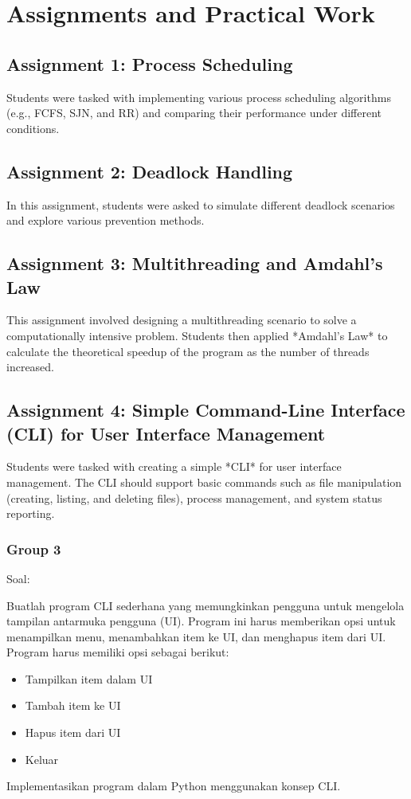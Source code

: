 \documentclass[12pt]{article}
\begin{document}
	\section{Assignments and Practical Work}
	\subsection{Assignment 1: Process Scheduling}
	Students were tasked with implementing various process scheduling algorithms (e.g., FCFS, SJN, and RR) and comparing their performance under different conditions.
	
	\subsection{Assignment 2: Deadlock Handling}
	In this assignment, students were asked to simulate different deadlock scenarios and explore various prevention methods.
	
	\subsection{Assignment 3: Multithreading and Amdahl's Law}
	This assignment involved designing a multithreading scenario to solve a computationally intensive problem. Students then applied *Amdahl's Law* to calculate the theoretical speedup of the program as the number of threads increased.
	
	\subsection{Assignment 4: Simple Command-Line Interface (CLI) for User Interface Management}
	Students were tasked with creating a simple *CLI* for user interface management. The CLI should support basic commands such as file manipulation (creating, listing, and deleting files), process management, and system status reporting.
	
	\subsubsection*{Group 3}
	Soal:
	\par Buatlah program CLI sederhana yang memungkinkan pengguna untuk mengelola tampilan antarmuka pengguna (UI). Program ini harus memberikan opsi untuk menampilkan menu, menambahkan item ke UI, dan menghapus item dari UI.
	Program harus memiliki opsi sebagai berikut:
	\begin{itemize}
		\item Tampilkan item dalam UI
		\item Tambah item ke UI
		\item Hapus item dari UI
		\item Keluar
	\end{itemize}
	\par Implementasikan program dalam Python menggunakan konsep CLI.
	
\end{document}
